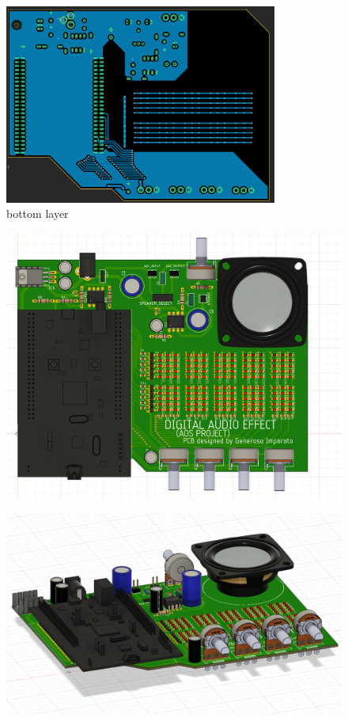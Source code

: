     \begin{figure}[H]
      \centering
        \includegraphics[width=0.8\textwidth]{img/bot.png}
        \caption{bottom layer}
    \end{figure}
    
    \newpage
    
    
    \begin{figure}[H]
      \centering
        \includegraphics[width=\textwidth]{img/pcb1.png}
    \end{figure}
    
    \begin{figure}[H]
      \centering
        \includegraphics[width=\textwidth]{img/pcb2.png}
    \end{figure}
    

